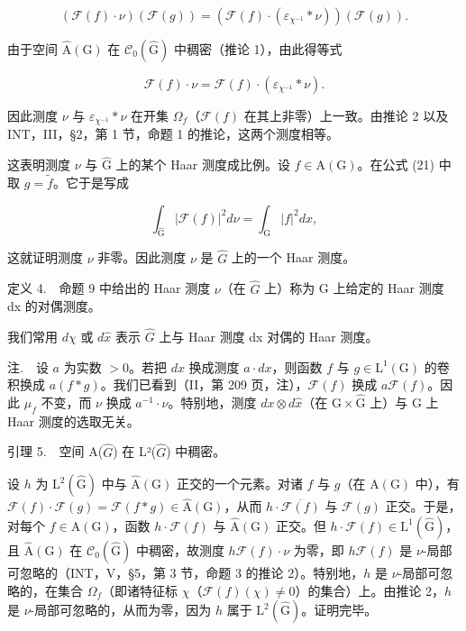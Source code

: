 \[
(\mathscr {F} (f) \cdot \nu) (\mathscr {F} (g)) = (\mathscr {F} (f) \cdot (\varepsilon_ {\chi^ {- 1}} * \nu)) (\mathscr {F} (g)).
\]

由于空间 \(\widehat{\mathrm{A}}(\mathrm{G})\) 在 \(\mathcal{C}_{0}(\widehat{\mathrm{G}})\) 中稠密（推论 1），由此得等式

\[
\mathscr {F} (f) \cdot \nu = \mathscr {F} (f) \cdot (\varepsilon_ {\chi^ {- 1}} * \nu).
\]

因此测度 \(\nu\) 与 \(\varepsilon_{\chi^{-1}} * \nu\) 在开集 \(\Omega_f\)（\(\mathcal{F}(f)\) 在其上非零）上一致。由推论 2 以及 INT，III，§2，第 1 节，命题 1 的推论，这两个测度相等。

这表明测度 \(\nu\) 与 \(\widehat{\mathrm{G}}\) 上的某个 Haar 测度成比例。设 \(f \in \mathrm{A}(\mathrm{G})\)。在公式 (21) 中取 \(g = \widetilde{f}\)。它于是写成

\[
\int_ {\widehat {\mathrm{G}}} | \mathcal {F} (f) | ^ {2} d \nu = \int_ {\mathrm{G}} | f | ^ {2} d x,\tag{22}
\]

这就证明测度 \(\nu\) 非零。因此测度 \(\nu\) 是 \(\widehat{G}\) 上的一个 Haar 测度。

定义 4.　命题 9 中给出的 Haar 测度 \(\nu\)（在 \(\widehat{G}\) 上）称为 G 上给定的 Haar 测度 dx 的对偶测度。

我们常用 \(d\chi\) 或 \(d\widehat{x}\) 表示 \(\widehat{G}\) 上与 Haar 测度 dx 对偶的 Haar 测度。

注.　设 \(a\) 为实数 \(>0\)。若把 \(dx\) 换成测度 \(a \cdot dx\)，则函数 \(f\) 与 \(g \in \mathrm{L}^{1}(\mathrm{G})\) 的卷积换成 \(a(f*g)\)。我们已看到（II，第 209 页，注），\(\mathcal{F}(f)\) 换成 \(a\mathcal{F}(f)\)。因此 \(\mu_{f}\) 不变，而 \(\nu\) 换成 \(a^{-1} \cdot \nu\)。特别地，测度 \(dx \otimes d\hat{x}\)（在 \(\mathrm{G} \times \hat{\mathrm{G}}\) 上）与 \(\mathrm{G}\) 上 Haar 测度的选取无关。

引理 5.　空间 A(\(\hat{G}\)) 在 L²(\(\hat{G}\)) 中稠密。

设 \(h\) 为 \(\mathrm{L}^2(\widehat{\mathrm{G}})\) 中与 \(\widehat{\mathrm{A}}(\mathrm{G})\) 正交的一个元素。对诸 \(f\) 与 \(g\)（在 \(\mathrm{A}(\mathrm{G})\) 中），有 \(\mathcal{F}(f) \cdot \mathcal{F}(g) = \mathcal{F}(f*g) \in \widehat{\mathrm{A}}(\mathrm{G})\)，从而 \(h \cdot \overline{\mathcal{F}(f)}\) 与 \(\mathcal{F}(g)\) 正交。于是，对每个 \(f \in \mathrm{A}(\mathrm{G})\)，函数 \(h \cdot \mathcal{F}(f)\) 与 \(\widehat{\mathrm{A}}(\mathrm{G})\) 正交。但 \(h \cdot \mathcal{F}(f) \in \mathrm{L}^1(\widehat{\mathrm{G}})\)，且 \(\widehat{\mathrm{A}}(\mathrm{G})\) 在 \(\mathcal{C}_0(\widehat{\mathrm{G}})\) 中稠密，故测度 \(h\mathcal{F}(f) \cdot \nu\) 为零，即 \(h\mathcal{F}(f)\) 是 \(\nu\)-局部可忽略的（INT，V，§5，第 3 节，命题 3 的推论 2）。特别地，\(h\) 是 \(\nu\)-局部可忽略的，在集合 \(\Omega_f\)（即诸特征标 \(\chi\)（\(\mathcal{F}(f)(\chi) \neq 0\)）的集合）上。由推论 2，\(h\) 是 \(\nu\)-局部可忽略的，从而为零，因为 \(h\) 属于 \(\mathrm{L}^2(\widehat{\mathrm{G}})\)。证明完毕。

